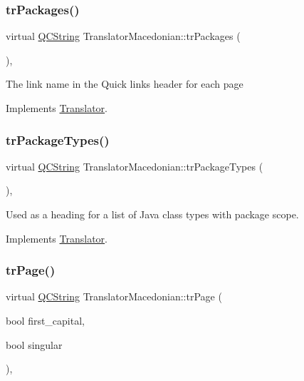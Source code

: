 \subsubsection{\texorpdfstring{trPackages()}{trPackages()}}
{\footnotesize\ttfamily virtual \mbox{\hyperlink{class_q_c_string}{Q\+C\+String}} Translator\+Macedonian\+::tr\+Packages (\begin{DoxyParamCaption}{ }\end{DoxyParamCaption})\hspace{0.3cm}{\ttfamily [inline]}, {\ttfamily [virtual]}}

The link name in the Quick links header for each page 

Implements \mbox{\hyperlink{class_translator}{Translator}}.

\mbox{\label{class_translator_macedonian_afce0db30d001722983ad0a28c57a5ece}} 
\subsubsection{\texorpdfstring{trPackageTypes()}{trPackageTypes()}}
{\footnotesize\ttfamily virtual \mbox{\hyperlink{class_q_c_string}{Q\+C\+String}} Translator\+Macedonian\+::tr\+Package\+Types (\begin{DoxyParamCaption}{ }\end{DoxyParamCaption})\hspace{0.3cm}{\ttfamily [inline]}, {\ttfamily [virtual]}}

Used as a heading for a list of Java class types with package scope. 

Implements \mbox{\hyperlink{class_translator}{Translator}}.

\mbox{\label{class_translator_macedonian_a470cefecd9b312be0b7ee071fc100472}} 
\subsubsection{\texorpdfstring{trPage()}{trPage()}}
{\footnotesize\ttfamily virtual \mbox{\hyperlink{class_q_c_string}{Q\+C\+String}} Translator\+Macedonian\+::tr\+Page (\begin{DoxyParamCaption}\item[{bool}]{first\+\_\+capital,  }\item[{bool}]{singular }\end{DoxyParamCaption})\hspace{0.3cm}{\ttfamily [inline]}, {\ttfamily [virtual]}}

